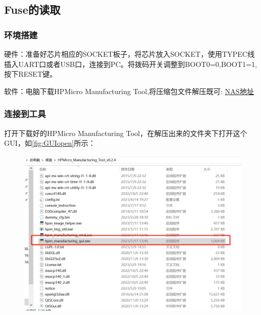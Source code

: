 \clearpage
\subsection{Fuse的读取}
\subsubsection{环境搭建}
硬件：准备好芯片相应的SOCKET板子，将芯片放入SOCKET，使用TYPEC线插入UART口或者USB口，连接到PC。将拨码开关调整到BOOT0=0,BOOT1=1,按下RESET键。\par
软件：电脑下载HPMicro Manufacturing Tool,将压缩包文件解压既可:%
\href{\\192.168.11.200\\Shared\\HPM\_SDK\tools\hpm\_manufacturing\_tool}{NAS地址} \\	

\subsubsection{连接到工具}
打开下载好的HPMicro Manufacturing Tool，在解压出来的文件夹下打开这个GUI，如\autoref{fig:GUIopen}所示：\par
\vspace{\baselineskip}
\vspace{0.4cm}
\begin{figure}[H]
	\centering
	\includegraphics[width=0.7\linewidth]{img/GUIopen}
	\caption{}
	\label{fig:GUIopen}
\end{figure}

\vspace{\baselineskip}
\vspace{0.5cm}  

